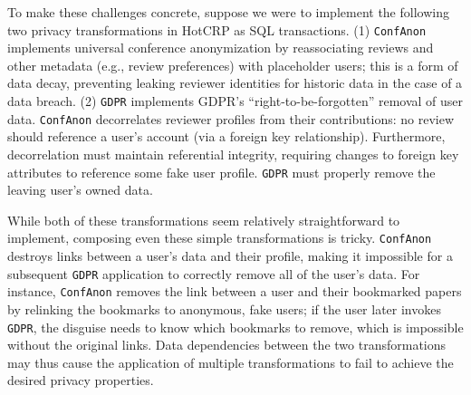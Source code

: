 %
To make these challenges concrete, suppose we were to implement the following two privacy
transformations in HotCRP as SQL transactions. (1) \texttt{ConfAnon} implements universal conference
anonymization by reassociating reviews and other metadata (e.g., review preferences) with
placeholder users; this is a form of data decay, preventing leaking reviewer identities for historic data in
the case of a data breach. (2) \texttt{GDPR} implements GDPR's ``right-to-be-forgotten'' removal of user data.
%
\texttt{ConfAnon} decorrelates reviewer profiles from their contributions: no review should reference a
user's account (via a foreign key relationship).
Furthermore, decorrelation must maintain referential integrity, requiring changes to foreign key
attributes to reference some fake user profile.
\texttt{GDPR} must properly remove the leaving user's owned data.

While both of these transformations seem relatively straightforward to implement, composing even
these simple transformations is tricky. \texttt{ConfAnon} destroys links between a user's data and
their profile, making it impossible for a subsequent \texttt{GDPR} application to correctly remove
all of the user's data.
%
For instance, \texttt{ConfAnon} removes the link between a user and their bookmarked papers by
relinking the bookmarks to anonymous, fake users; if the user later invokes \texttt{GDPR}, the
disguise needs to know which bookmarks to remove, which is impossible without the
original links.
%
Data dependencies between the two transformations may thus cause the application of multiple
transformations to fail to achieve the desired privacy properties.
%
